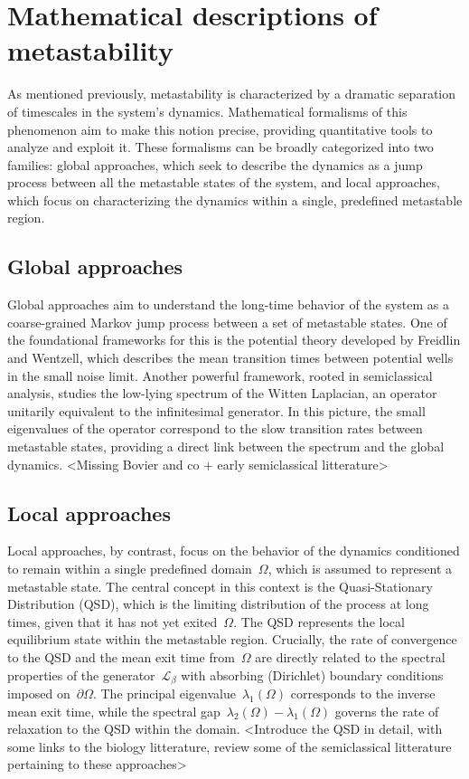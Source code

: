 \section{Mathematical descriptions of metastability}
\label{sec:01:metastability}
As mentioned previously, metastability is characterized by a dramatic separation of timescales in the system's dynamics. %
Mathematical formalisms of this phenomenon aim to make this notion precise, providing quantitative tools to analyze and exploit it. %
These formalisms can be broadly categorized into two families: global approaches, which seek to describe the dynamics as a jump process between all the metastable states of the system, and local approaches, which focus on characterizing the dynamics within a single, predefined metastable region. %

\subsection{Global approaches}
Global approaches aim to understand the long-time behavior of the system as a coarse-grained Markov jump process between a set of metastable states. %
One of the foundational frameworks for this is the potential theory developed by Freidlin and Wentzell, which describes the mean transition times between potential wells in the small noise limit. %
Another powerful framework, rooted in semiclassical analysis, studies the low-lying spectrum of the Witten Laplacian, an operator unitarily equivalent to the infinitesimal generator. %
In this picture, the small eigenvalues of the operator correspond to the slow transition rates between metastable states, providing a direct link between the spectrum and the global dynamics. %
<Missing Bovier and co + early semiclassical litterature>

\subsection{Local approaches}
Local approaches, by contrast, focus on the behavior of the dynamics conditioned to remain within a single predefined domain~$\Omega$, which is assumed to represent a metastable state. %
The central concept in this context is the Quasi-Stationary Distribution (QSD), which is the limiting distribution of the process at long times, given that it has not yet exited~$\Omega$. %
The QSD represents the local equilibrium state within the metastable region. %
Crucially, the rate of convergence to the QSD and the mean exit time from~$\Omega$ are directly related to the spectral properties of the generator~$\mathcal{L}_\beta$ with absorbing (Dirichlet) boundary conditions imposed on~$\partial\Omega$. %
The principal eigenvalue~$\lambda_1(\Omega)$ corresponds to the inverse mean exit time, while the spectral gap~$\lambda_2(\Omega) - \lambda_1(\Omega)$ governs the rate of relaxation to the QSD within the domain. %
<Introduce the QSD in detail, with some links to the biology litterature, review some of the semiclassical litterature pertaining to these approaches>

